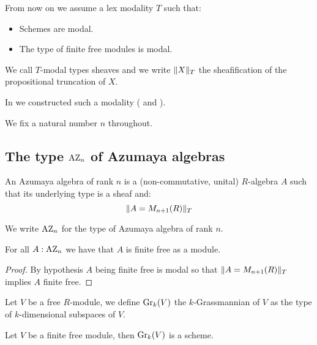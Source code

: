 From now on we assume a lex modality $T$ such that:
\begin{itemize}
\item Schemes are modal.
\item The type of finite free modules is modal.
\end{itemize}
We call $T$-modal types sheaves and we write $\lVert X \rVert_T$ the sheafification of the propositional truncation of $X$.

In  we constructed such a modality ( and ).

We fix a natural number $n$ throughout.


\subsection{The type $\mathrm{AZ}_n$ of Azumaya algebras}

\begin{definition}
An Azumaya algebra of rank $n$ is a (non-commutative, unital) $R$-algebra $A$ such that its underlying type is a sheaf and:
\[\lVert A=M_{n+1}(R) \rVert_T\]
\end{definition}

We write $\mathrm{AZ}_n$ for the type of Azumaya algebra of rank $n$.

\begin{lemma}\label{azumayas-are-finite-free}
For all $A:\mathrm{AZ}_n$ we have that $A$ is finite free as a module.
\end{lemma}

\begin{proof}
By hypothesis $A$ being finite free is modal so that $\lVert A=M_{n+1}(R) \rVert_T$ implies $A$ finite free.
\end{proof}

\begin{definition}
Let $V$ be a free $R$-module, we define $\mathrm{Gr}_k(V)$ the $k$-Grassmannian of $V$ as the type of $k$-dimensional subspaces of $V$.
\end{definition}

\begin{lemma}\label{grassmanians-are-schemes}
Let $V$ be a finite free module, then $\mathrm{Gr}_k(V)$ is a scheme.
\end{lemma}

